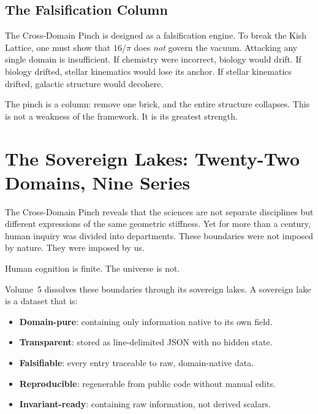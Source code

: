 \documentclass[11pt, letterpaper, openany]{book}
\begin{document}
\section*{The Falsification Column}
The Cross-Domain Pinch is designed as a falsification engine. To break the Kish Lattice, one
must show that $16/\pi$ does \emph{not} govern the vacuum. Attacking any single domain is
insufficient. If chemistry were incorrect, biology would drift. If biology drifted, stellar
kinematics would lose its anchor. If stellar kinematics drifted, galactic structure would
decohere.

The pinch is a column: remove one brick, and the entire structure collapses.
This is not a weakness of the framework.
It is its greatest strength.

\chapter{The Sovereign Lakes: Twenty-Two Domains, Nine Series}

The Cross-Domain Pinch reveals that the sciences are not separate disciplines but different
expressions of the same geometric stiffness. Yet for more than a century, human inquiry was
divided into departments. These boundaries were not imposed by nature. They were imposed by
us.

Human cognition is finite.
The universe is not.

Volume~5 dissolves these boundaries through its sovereign lakes. A sovereign lake is a dataset
that is:

\begin{itemize}
    \item \textbf{Domain-pure}: containing only information native to its own field.
    \item \textbf{Transparent}: stored as line-delimited JSON with no hidden state.
    \item \textbf{Falsifiable}: every entry traceable to raw, domain-native data.
    \item \textbf{Reproducible}: regenerable from public code without manual edits.
    \item \textbf{Invariant-ready}: containing raw information, not derived scalars.
\end{itemize}
\end{document}
